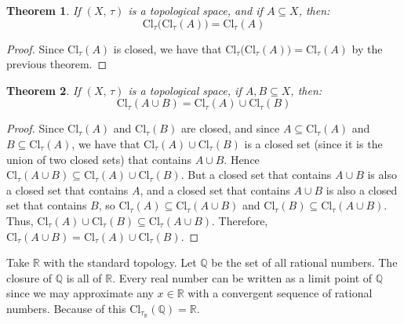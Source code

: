 \documentclass{article}
\theoremstyle{plain}
\newtheorem{theorem}{Theorem}[section]
\theoremstyle{normal}
\newenvironment{example}{%
    \pushQED{\qed}\renewcommand{\qedsymbol}{$\blacksquare$}\examplex%
}{%
    \popQED\endexamplex%
}
\begin{document}
        \begin{theorem}
            If $(X,\,\tau)$ is a topological space, and if $A\subseteq{X}$,
            then:
            \begin{equation}
                \textrm{Cl}_{\tau}\big(\textrm{Cl}_{\tau}(A)\big)
                =\textrm{Cl}_{\tau}(A)
            \end{equation}
        \end{theorem}
        \begin{proof}
            Since $\textrm{Cl}_{\tau}(A)$ is closed, we have that
            $\textrm{Cl}_{\tau}\big(\textrm{Cl}_{\tau}(A)\big)=\textrm{Cl}_{\tau}(A)$
            by the previous theorem.
        \end{proof}
        \begin{theorem}
            If $(X,\,\tau)$ is a topological space, if
            $A,B\subseteq{X}$, then:
            \begin{equation}
                \textrm{Cl}_{\tau}(A\cup{B})
                =\textrm{Cl}_{\tau}(A)\cup\textrm{Cl}_{\tau}(B)
            \end{equation}
        \end{theorem}
        \begin{proof}
            Since $\textrm{Cl}_{\tau}(A)$ and $\textrm{Cl}_{\tau}(B)$ are
            closed, and since
            $A\subseteq\textrm{Cl}_{\tau}(A)$ and
            $B\subseteq\textrm{Cl}_{\tau}(A)$, we have that
            $\textrm{Cl}_{\tau}(A)\cup\textrm{Cl}_{\tau}(B)$ is a closed set
            (since it is the union of two closed sets) that contains
            $A\cup{B}$. Hence
            $\textrm{Cl}_{\tau}(A\cup{B})\subseteq\textrm{Cl}_{\tau}(A)\cup\textrm{Cl}_{\tau}(B)$.
            But a closed set that contains $A\cup{B}$ is also a closed set that
            contains $A$, and a closed set that contains $A\cup{B}$ is also a
            closed set that contains $B$, so
            $\textrm{Cl}_{\tau}(A)\subseteq\textrm{Cl}_{\tau}(A\cup{B})$ and
            $\textrm{Cl}_{\tau}(B)\subseteq\textrm{Cl}_{\tau}(A\cup{B})$. Thus,
            $\textrm{Cl}_{\tau}(A)\cup\textrm{Cl}_{\tau}(B)\subseteq\textrm{Cl}_{\tau}(A\cup{B})$.
            Therefore,
            $\textrm{Cl}_{\tau}(A\cup{B})=\textrm{Cl}_{\tau}(A)\cup\textrm{Cl}_{\tau}(B)$.
        \end{proof}
        \begin{example}
            Take $\mathbb{R}$ with the standard topology. Let $\mathbb{Q}$
            be the set of all rational numbers. The closure of
            $\mathbb{Q}$ is all of $\mathbb{R}$. Every real number can be
            written as a limit point of $\mathbb{Q}$ since we may approximate
            any $x\in\mathbb{R}$ with a convergent sequence of rational numbers.
            Because of this
            $\textrm{Cl}_{\tau_{\mathbb{R}}}(\mathbb{Q})=\mathbb{R}$.
        \end{example}
\end{document}
